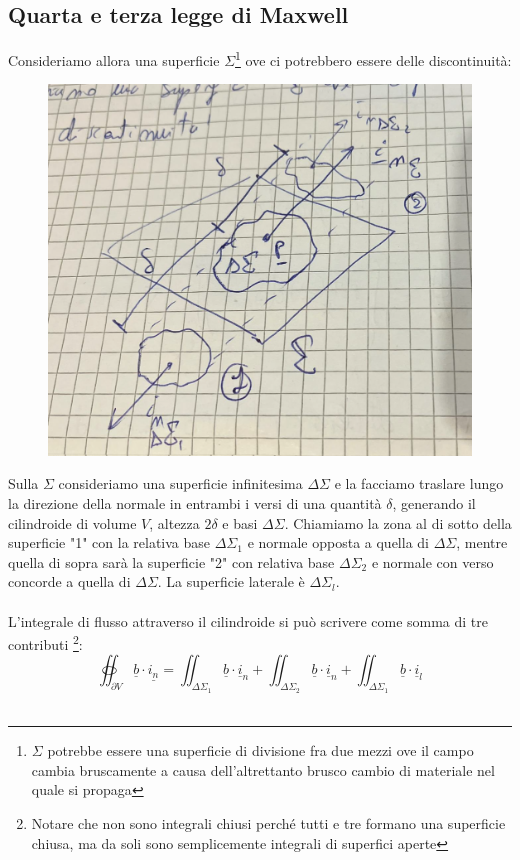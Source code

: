 \documentclass{book}
\begin{document}
        \subsection{Quarta e terza legge di Maxwell}
        Consideriamo allora una superficie $\Sigma$\footnote{$\Sigma$ potrebbe essere una superficie di divisione fra due mezzi ove il campo cambia bruscamente a causa dell'altrettanto brusco cambio di materiale nel quale si propaga} ove ci potrebbero essere delle discontinuità:
        \begin{figure}[h!]
            \centering
            \includegraphics[width=0.5\linewidth]{img//Chapter_one/Chapt1img5.png}
            \caption{}
        \end{figure}
        Sulla $\Sigma$ consideriamo una superficie infinitesima $\Delta \Sigma$ e la facciamo traslare lungo la direzione della normale in entrambi i versi di una quantità $\delta$, generando il cilindroide di volume $V$, altezza $2 \delta$ e basi $\Delta \Sigma$. Chiamiamo la zona al di sotto della superficie "1" con la relativa base $\Delta \Sigma_{1}$ e normale opposta a quella di $\Delta \Sigma$, mentre quella di sopra sarà la superficie "2" con relativa base $\Delta \Sigma_{2}$ e normale con verso concorde a quella di $\Delta \Sigma$. La superficie laterale è $\Delta \Sigma_{l}$. \\ \\
        L'integrale di flusso attraverso il cilindroide si può scrivere come somma di tre contributi \footnote{Notare che non sono integrali chiusi perché tutti e tre formano una superficie chiusa, ma da soli sono semplicemente integrali di superfici aperte}:
        \begin{equation}
            \oiint_{\partial V} \underline{b} \cdot \underline{i_{n}} = \iint_{\Delta \Sigma_{1}} \underline{b} \cdot \underline{i}_{n} + \iint_{\Delta \Sigma_{2}} \underline{b} \cdot \underline{i}_{n} + \iint_{\Delta \Sigma_{1}} \underline{b} \cdot \underline{i}_{l}
        \end{equation} \\
\end{document}
